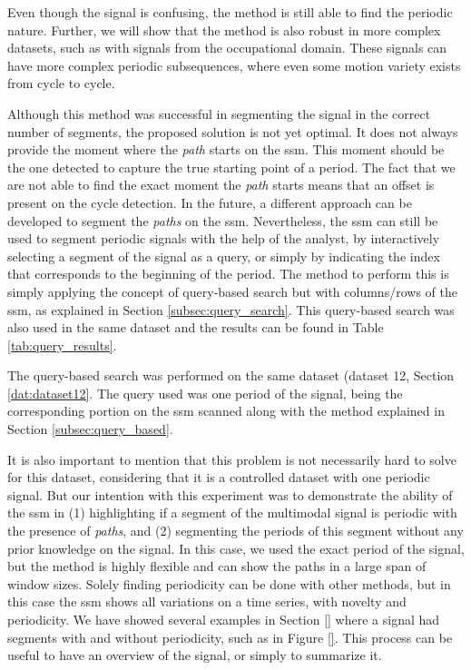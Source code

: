 Even though the signal is confusing, the method is still able to find the periodic nature. Further, we will show that the method is also robust in more complex datasets, such as with signals from the occupational domain. These signals can have more complex periodic subsequences, where even some motion variety exists from cycle to cycle.
\par
Although this method was successful in segmenting the signal in the correct number of segments, the proposed solution is not yet optimal. It does not always provide the moment where the \textit{path} starts on the \gls{ssm}. This moment should be the one detected to capture the true starting point of a period. The fact that we are not able to find the exact moment the \textit{path} starts means that an offset is present on the cycle detection. In the future, a different approach can be developed to segment the \textit{paths} on the \gls{ssm}. Nevertheless, the \gls{ssm} can still be used to segment periodic signals with the help of the analyst, by interactively selecting a segment of the signal as a query, or simply by indicating the index that corresponds to the beginning of the period. The method to perform this is simply applying the concept of query-based search but with columns/rows of the \gls{ssm}, as explained in Section \ref{subsec:query_search}. This query-based search was also used in the same dataset and the results can be found in Table \ref{tab:query_results}.
\par
The query-based search was performed on the same dataset (dataset 12, Section \ref{dat:dataset12}. The query used was one period of the signal, being the corresponding portion on the \gls{ssm} scanned along with the method explained in Section \ref{subsec:query_based}. 


It is also important to mention that this problem is not necessarily hard to solve for this dataset, considering that it is a controlled dataset with one periodic signal. But our intention with this experiment was to demonstrate the ability of the \gls{ssm} in (1) highlighting if a segment of the multimodal signal is periodic with the presence of \textit{paths}, and (2) segmenting the periods of this segment without any prior knowledge on the signal. In this case, we used the exact period of the signal, but the method is highly flexible and can show the paths in a large span of window sizes. Solely finding periodicity can be done with other methods, but in this case the \gls{ssm} shows all variations on a time series, with novelty and periodicity. We have showed several examples in Section \ref{} where a signal had segments with and without periodicity, such as in Figure \ref{}. This process can be useful to have an overview of the signal, or simply to summarize it. 

